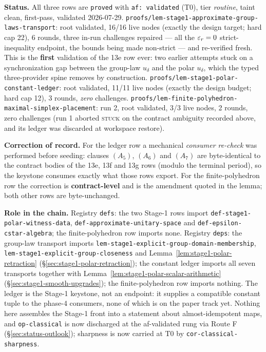 \medskip
\noindent\textbf{Status.} All three rows are \texttt{proved} with \texttt{af: validated}
(T0), tier \emph{routine}, taint clean, first-pass, validated 2026-07-29.
\texttt{proofs/lem-stage1-approximate-group-laws-transport}: root validated, 16/16 live nodes
(exactly the design target; hard cap 22), 6 rounds, three in-run challenges repaired --- all
the $\varepsilon_r=0$ strict-inequality endpoint, the bounds being made non-strict --- and
re-verified fresh. This is the \textbf{first} validation of the 13e row ever: two earlier
attempts stuck on a synchronization gap between the group-law $u_\delta$ and the polar
$u_\delta$, which the typed three-provider spine removes by construction.
\texttt{proofs/lem-stage1-polar-constant-ledger}: root validated, 11/11 live nodes (exactly
the design budget; hard cap 12), 3 rounds, \emph{zero} challenges.
\texttt{proofs/lem-finite-polyhedron-maximal-simplex-placement}: run 2, root validated, 3/3
live nodes, 2 rounds, zero challenges (run 1 aborted \textsc{stuck} on the contract ambiguity
recorded above, and its ledger was discarded at workspace restore).

\noindent\textbf{Correction of record.} For the ledger row a mechanical \emph{consumer
re-check} was performed before seeding: clauses $(A_5)$, $(A_6)$ and $(A_7)$ are
byte-identical to the contract bodies of the 13e, 13f and 13g rows (modulo the terminal
period), so the keystone consumes exactly what those rows export. For the finite-polyhedron
row the correction is \textbf{contract-level} and is the amendment quoted in the lemma; both
other rows are byte-unchanged.

\noindent\textbf{Role in the chain.} Registry \texttt{defs}: the two Stage-1 rows import
\texttt{def-stage1-polar-witness-data}, \texttt{def-approximate-unitary-space} and
\texttt{def-epsilon-cstar-algebra}; the finite-polyhedron row imports none. Registry
\texttt{deps}: the group-law transport imports
\texttt{lem-stage1-explicit-group-domain-membership},
\texttt{lem-stage1-explicit-group-closeness} and
Lemma~\ref{lem:stage1-polar-retraction} (\S\ref{sec:stage1-polar-retraction}); the constant
ledger imports all seven transports together with
Lemma~\ref{lem:stage1-polar-scalar-arithmetic} (\S\ref{sec:stage1-smooth-upgrades}); the
finite-polyhedron row imports nothing. The ledger is the Stage-1 keystone, not an endpoint:
it supplies a compatible constant tuple to the phase-4 consumers, none of which is on the
paper track yet. Nothing here assembles the Stage-1 front into a statement about
almost-idempotent maps, and \texttt{op-classical} is now discharged at the af-validated rung via Route F (\S\ref{sec:status-outlook}); sharpness is now carried at T0 by \texttt{cor-classical-sharpness}.
